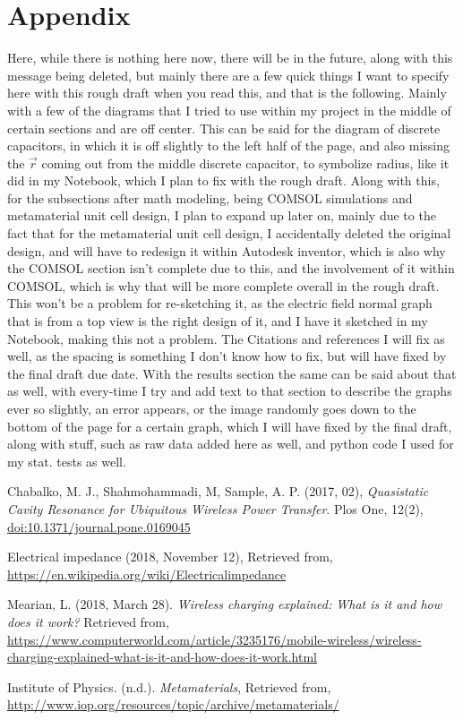 \documentclass[]{article}
\begin{document}
\section*{Appendix}
Here, while there is nothing here now, there will be in the future, along with this message being deleted, but mainly there are a few quick things I want to specify here with this rough draft when you read this, and that is the following. Mainly with a few of the diagrams that I tried to use within my project in the middle of certain sections and are off center. This can be said for the diagram of discrete capacitors, in which it is off slightly to the left half of the page, and also missing the $\vec{r}$ coming out from the middle discrete capacitor, to symbolize radius, like it did in my Notebook, which I plan to fix with the rough draft. Along with this, for the subsections after math modeling, being COMSOL simulations and metamaterial unit cell design, I plan to expand up later on, mainly due to the fact that for the metamaterial unit cell design, I accidentally deleted the original design, and will have to redesign it within Autodesk inventor, which is also why the COMSOL section isn't complete due to this, and the involvement of it within COMSOL, which is why that will be more complete overall in the rough draft. This won't be a problem for re-sketching it, as the electric field normal graph that is from a top view is the right design of it, and I have it sketched in my Notebook, making this not a problem. The Citations and references I will fix as well, as the spacing is something I don't know how to fix, but will have fixed by the final draft due date. With the results section the same can be said about that as well, with every-time I try and add text to that section to describe the graphs ever so slightly, an error appears, or the image randomly goes down to the bottom of the page for a certain graph, which I will have fixed by the final draft, along with stuff, such as raw data added here as well, and python code I used for my stat. tests as well.
\begin{thebibliography}{999}
	\raggedright
	Chabalko, M. J., Shahmohammadi, M, Sample, A. P.
	(2017, 02),
	\emph{Quasistatic Cavity Resonance for Ubiquitous Wireless Power Transfer}.
	Plos One, 12(2), 
	\url{doi:10.1371/journal.pone.0169045}
	
	\raggedright
	Electrical impedance
	(2018, November 12),
	Retrieved from,
    \url{https://en.wikipedia.org/wiki/Electricalimpedance}
    
    \raggedright
    Mearian, L.
    (2018, March 28).
    \emph{Wireless charging explained: What is it and how does it work?}
    Retrieved from,
    \url{https://www.computerworld.com/article/3235176/mobile-wireless/wireless-charging-explained-what-is-it-and-how-does-it-work.html}
    
    \raggedright
    Institute of Physics.
    (n.d.).
    \emph{Metamaterials},
    Retrieved from,
    \url{http://www.iop.org/resources/topic/archive/metamaterials/}
	
\end{thebibliography}
\end{document}
